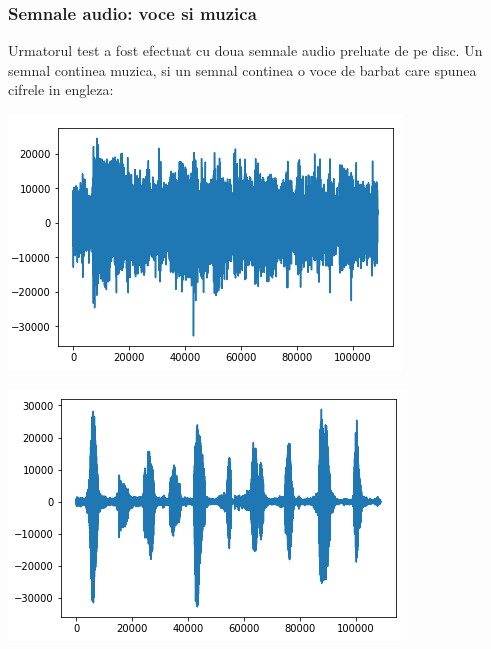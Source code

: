 \documentclass[12pt,oneside]{article}
\begin{document}
\subsubsection{Semnale audio: voce si muzica}
Urmatorul test a fost efectuat cu doua semnale audio preluate de pe disc. Un semnal continea muzica, si un semnal continea o voce de barbat care spunea cifrele in engleza:
\begin{center}
	\includegraphics[scale=1]{music_music}
\end{center}
\begin{center}
	\includegraphics[scale=1]{speech_music}
\end{center}
\end{document}
